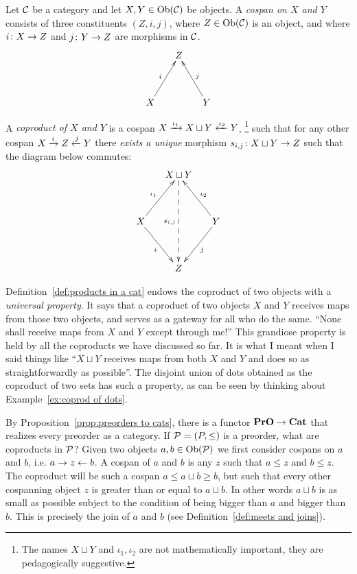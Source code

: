 \documentclass[CT4S-EN-RU]{subfiles}
\begin{document}
\begin{definitionENG}\label{def:coproducts in a cat}
Let $\mathcal{C}$ be a category and let $X,Y\in\textnormal{Ob}(\mathcal{C})$ be objects. A {\em cospan on $X$ and $Y$} consists of three constituents $(Z,i,j)$, where $Z\in\textnormal{Ob}(\mathcal{C})$ is an object, and where $i\colon X\rightarrow Z$ and $j\colon Y\rightarrow Z$ are morphisms in $\mathcal{C}$. 
$$\xymatrix@=15pt{&Z\\\\X\ar[ruu]^i&&Y\ar[luu]_j}$$   

A {\em coproduct of $X$ and $Y$} is a cospan $X\xrightarrow{\iota_1}X\sqcup Y\xleftarrow{\iota_2}Y$, \footnote{The names $X\sqcup Y$ and $\iota_1,\iota_2$ are not mathematically important, they are pedagogically suggestive.} such that for any other cospan $X\xrightarrow{i}Z\xleftarrow{j}Y$ there {\em exists a unique} morphism $s_{i,j}\colon X\sqcup Y\rightarrow Z$ such that the diagram below commutes:
$$
\xymatrix@=15pt{&X\sqcup Y\ar@{-->}[dddd]_{s_{i,j}}\\\\X\ar[uur]^{\iota_1}\ar[ddr]_i&&Y\ar[uul]_{\iota_2}\ar[ddl]^j\\\\&Z}
$$
\end{definitionENG}

\begin{definitionRUS}\label{def:coproducts in a cat}
\end{definitionRUS}

\begin{remarkENG}
Definition~\ref{def:products in a cat} endows the coproduct of two objects with a {\em universal property}. It says that a coproduct of two objects $X$ and $Y$ receives maps from those two objects, and serves as a gateway for all who do the same. “None shall receive maps from $X$ and $Y$ except through me!” This grandiose property is held by all the coproducts we have discussed so far. It is what I meant when I said things like “$X\sqcup Y$ receives maps from both $X$ and $Y$ and does so as straightforwardly as possible”.  The disjoint union of dots obtained as the coproduct of two sets has such a property, as can be seen by thinking about Example~\ref{ex:coprod of dots}.
\end{remarkENG}

\begin{remarkRUS}
\end{remarkRUS}

\begin{exampleENG}
By Proposition~\ref{prop:preorders to cats}, there is a functor ${\mathbf{PrO}}\rightarrow{\mathbf{Cat}}$ that realizes every preorder as a category. If $\mathcal{P}=(P,\leq)$ is a preorder, what are coproducts in $\mathcal{P}$? Given two objects $a,b\in\textnormal{Ob}(\mathcal{P})$ we first consider cospans on $a$ and $b$, i.e. $a\rightarrow z\leftarrow b$. A cospan of $a$ and $b$ is any $z$ such that $a\leq z$ and $b\leq z$. The coproduct will be such a cospan $a\leq a\sqcup b\geq b$, but such that every other cospanning object $z$ is greater than or equal to $a\sqcup b$. In other words $a\sqcup b$ is as small as possible subject to the condition of being bigger than $a$ and bigger than $b$. This is precisely the join of $a$ and $b$ (see Definition~\ref{def:meets and joins}).
\end{exampleENG}
\end{document}
